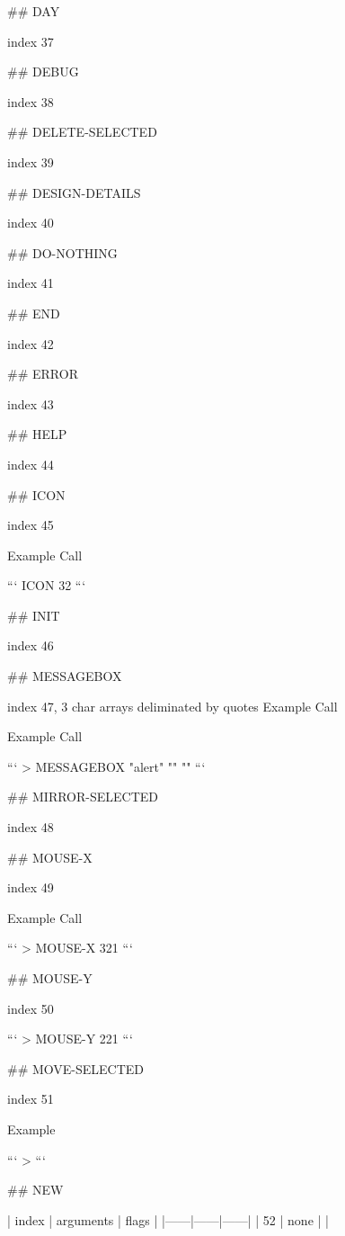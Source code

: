## DAY

index 37



## DEBUG

index 38



## DELETE-SELECTED

index 39



## DESIGN-DETAILS

index 40



## DO-NOTHING

index 41



## END

index 42



## ERROR

index 43



## HELP

index 44



## ICON

index 45

Example Call

```
ICON 32
```

## INIT

index 46



## MESSAGEBOX

index 47, 3 char arrays deliminated by quotes Example Call

Example Call

```
> MESSAGEBOX "alert" "" ""
```

## MIRROR-SELECTED

index 48

## MOUSE-X

index 49

Example Call

```
> MOUSE-X
321
```

## MOUSE-Y

index 50

```
> MOUSE-Y
221
```

## MOVE-SELECTED

index 51

Example

```
> 
```

## NEW

| index | arguments | flags |
|------|------|------|
| 52 | none | |

